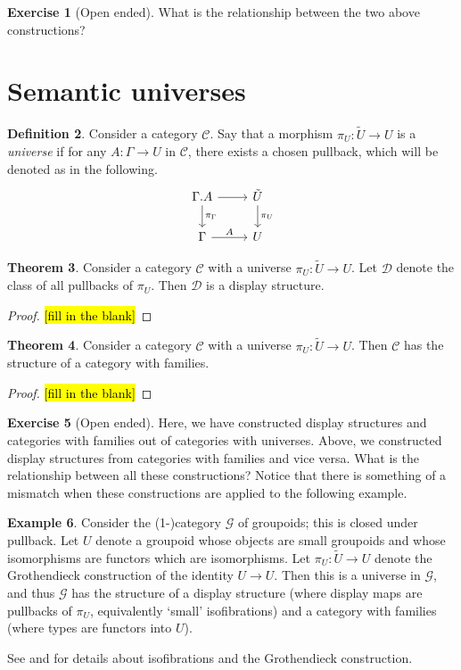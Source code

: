 \documentclass{article}
\theoremstyle{definition}
\newtheorem{definition}{Definition}[section]
\newtheorem{theorem}[definition]{Theorem}
\newtheorem{exercise}[definition]{Exercise}
\newtheorem{example}[definition]{Example}
\newcommand{\C}{\mathcal C}
\newcommand{\D}{\mathcal D}
\newcommand{\grpd}{\mathcal G}
\begin{document}
\begin{exercise}[Open ended]
    What is the relationship between the two above constructions?
\end{exercise}

\section{Semantic universes}

\begin{definition}
    Consider a category $\C$. Say that a morphism $\pi_U : \tilde{U} \to U$ is a \emph{universe} if for any $A: \Gamma \to U$ in $\C$, there exists a chosen pullback, which will be denoted as in the following.
    \[
         \begin{tikzcd}
             \Gamma.A \ar[r," "] \ar[d,"\pi_\Gamma"] & \tilde{U} \ar[d,"\pi_U"]
             \\ 
             \Gamma \ar[r,"A"] & U 
         \end{tikzcd}
    \]
\end{definition}

\begin{theorem}
    Consider a category $\C$ with a universe $\pi_U : \tilde{U} \to U$. Let $\D$ denote the class of all pullbacks of $\pi_U$. Then $\D$ is a display structure.
\end{theorem}
\begin{proof}
    \hl{[fill in the blank]}
\end{proof}

\begin{theorem}
    Consider a category $\C$ with a universe $\pi_U : \tilde{U} \to U$. Then $\C$ has the structure of a category with families.
\end{theorem}
\begin{proof}
    \hl{[fill in the blank]}
\end{proof}

\begin{exercise}[Open ended]
    Here, we have constructed display structures and categories with families out of categories with universes. Above, we constructed display structures from categories with families and vice versa. What is the relationship between all these constructions? Notice that there is something of a mismatch when these constructions are applied to the following example.
\end{exercise}

\begin{example}
    Consider the (1-)category $\grpd$ of groupoids; this is closed under pullback. Let $U$ denote a groupoid whose objects are small groupoids and whose isomorphisms are functors which are isomorphisms. Let $\pi_U: \tilde U \to U$ denote the Grothendieck construction of the identity $U \to U$. Then this is a universe in $\grpd$, and thus $\grpd$ has the structure of a display structure (where display maps are pullbacks of $\pi_U$, equivalently `small' isofibrations) and a category with families (where types are functors into $U$).

    See \cite{nLab-iso} and \cite{nLab-grothcons} for details about isofibrations and the Grothendieck construction.
\end{example}
\end{document}
